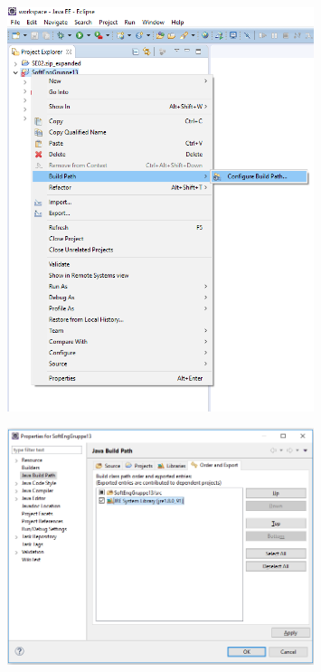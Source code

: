 \begin{figure}[H]
    \centering
    \includegraphics[width = 0.8\textwidth]{Figurer/Guide/ConfigureBuildPath.png}
\end{figure}

\begin{figure}[H]
    \centering
    \includegraphics[width = 0.8\textwidth]{Figurer/Guide/ConfigureBuildPath2.PNG}
\end{figure}

